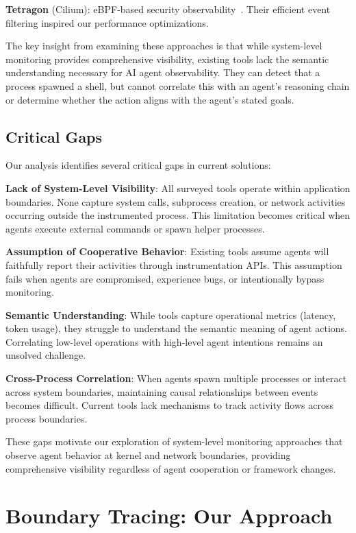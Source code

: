 \documentclass[sigplan,screen，review,9pt]{acmart}
\begin{document}
\textbf{Tetragon} (Cilium): eBPF-based security observability~\cite{tetragon}. Their efficient event filtering inspired our performance optimizations.

The key insight from examining these approaches is that while system-level monitoring provides comprehensive visibility, existing tools lack the semantic understanding necessary for AI agent observability. They can detect that a process spawned a shell, but cannot correlate this with an agent's reasoning chain or determine whether the action aligns with the agent's stated goals.

\subsection{Critical Gaps}

Our analysis identifies several critical gaps in current solutions:

\textbf{Lack of System-Level Visibility}: All surveyed tools operate within application boundaries. None capture system calls, subprocess creation, or network activities occurring outside the instrumented process. This limitation becomes critical when agents execute external commands or spawn helper processes.

\textbf{Assumption of Cooperative Behavior}: Existing tools assume agents will faithfully report their activities through instrumentation APIs. This assumption fails when agents are compromised, experience bugs, or intentionally bypass monitoring.

\textbf{Semantic Understanding}: While tools capture operational metrics (latency, token usage), they struggle to understand the semantic meaning of agent actions. Correlating low-level operations with high-level agent intentions remains an unsolved challenge.

\textbf{Cross-Process Correlation}: When agents spawn multiple processes or interact across system boundaries, maintaining causal relationships between events becomes difficult. Current tools lack mechanisms to track activity flows across process boundaries.

These gaps motivate our exploration of system-level monitoring approaches that observe agent behavior at kernel and network boundaries, providing comprehensive visibility regardless of agent cooperation or framework changes.


\section{Boundary Tracing: Our Approach}
\end{document}
